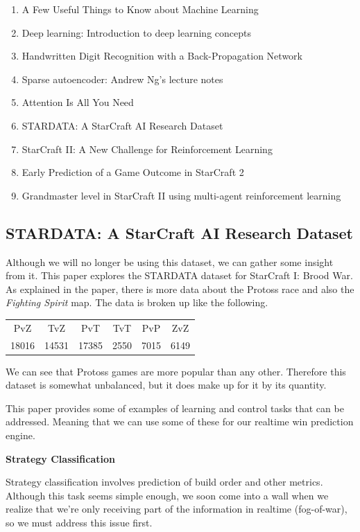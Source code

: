 \documentclass[a4paper,12pt]{report}
\newcommand{\msection}[1]{\noindent\textbf{#1}}
\begin{document}
\begin{enumerate}\setlength\itemsep{-.1cm}
\item A Few Useful Things to Know about Machine Learning
\item Deep learning: Introduction to deep learning concepts
\item Handwritten Digit Recognition with a Back-Propagation Network
\item Sparse autoencoder: Andrew Ng’s lecture notes
\item Attention Is All You Need
\item STARDATA: A StarCraft AI Research Dataset
\item StarCraft II: A New Challenge for Reinforcement Learning
\item Early Prediction of a Game Outcome in StarCraft 2
\item Grandmaster level in StarCraft II using multi-agent reinforcement learning
\end{enumerate}

\subsection{STARDATA: A StarCraft AI Research Dataset}

Although we will no longer be using this dataset, we can gather some insight from it. This paper explores the STARDATA dataset for StarCraft I: Brood War. As explained in the paper, there is more data about the Protoss race and also the \textit{Fighting Spirit} map. The data is broken up like the following.
\begin{center}
    \begin{tabular}{cccccc}
        \hline PvZ & TvZ & PvT & TvT & PvP & ZvZ \\
        18016 & 14531 & 17385 & 2550 & 7015 & 6149 \\ \hline
    \end{tabular}
\end{center}
We can see that Protoss games are more popular than any other. Therefore this dataset is somewhat unbalanced, but it does make up for it by its quantity.

This paper provides some of examples of learning and control tasks that can be addressed. Meaning that we can use some of these for our realtime win prediction engine.

\msection{Strategy Classification}

Strategy classification involves prediction of build order and other metrics. Although this task seems simple enough, we soon come into a wall when we realize that we're only receiving part of the information in realtime (fog-of-war), so we must address this issue first.
\end{document}
